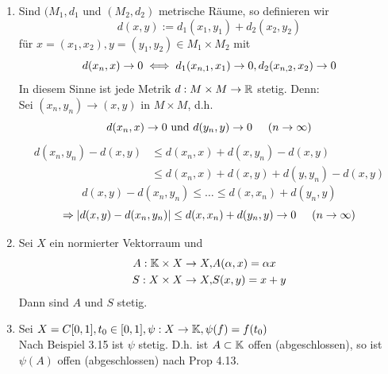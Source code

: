 \begin{beispiel}
	\begin{enumerate}[label=\alph*\upshape)]
		\item Sind $(M_{1}, d_{1}$ und $(M_{2}, d_{2})$ metrische Räume, so definieren wir
			\[ d(x, y) := d_{1}(x_{1}, y_{1}) + d_{2}(x_{2}, y_{2}) \]
			für $x = (x_{1}, x_{2}), y = (y_{1}, y_{2}) \in M_{1} \times M_{2}$ mit
			\[ d(x_{n}, x) \rightarrow 0 \iff d_{1}(x_{n,1}, x_{1}) \rightarrow 0, d_{2}(x_{n,2}, x_{2}) \rightarrow 0 \]
			In diesem Sinne ist jede Metrik $d: M \times M \rightarrow \mathbb{R}$ stetig. Denn: \\
			Sei $(x_{n}, y_{n}) \rightarrow (x, y)$ in $M \times M$, d.h.
			\[ d(x_{n}, x) \rightarrow 0 \text{ und } d(y_{n}, y) \rightarrow 0 \hspace{0.5cm} (n \rightarrow \infty) \]
			\begin{align*}
				 d(x_{n}, y_{n}) - d(x, y) & \leq d(x_{n}, x) + d(x, y_{n}) - d(x, y) \\
										  & \leq d(x_{n}, x) + d(x, y) + d(y, y_{n}) - d(x, y) 		
			\end{align*}
			\[ d(x, y)- d(x_{n}, y_{n}) \leq \dotsc \leq d(x, x_{n}) + d(y_{n}, y) \]
			\[ \Rightarrow | d(x, y) - d(x_{n}, y_{n}) | \leq d(x, x_{n}) + d(y_{n}, y) \rightarrow 0 \hspace{0.5cm} (n \rightarrow \infty) \]
		\item Sei $X$ ein normierter Vektorraum und
			\begin{align*}
				A: \mathbb{K} \times X \rightarrow X, & A( \alpha, x) = \alpha x \\
				S: X \times X \rightarrow X, & S(x, y) = x + y
			\end{align*}
			Dann sind $A$ und $S$ stetig.
		\item Sei $X = C[0, 1], t_{0} \in [0, 1], \psi : X \rightarrow \mathbb{K}, \psi(f) = f(t_{0})$ \\	%
		Nach Beispiel 3.15 ist $\psi$ stetig. D.h. ist $A \subset \mathbb{K}$ offen (abgeschlossen), so ist $\psi(A)$ offen (abgeschlossen) nach Prop 4.13. %
	\end{enumerate}	
\end{beispiel}

































